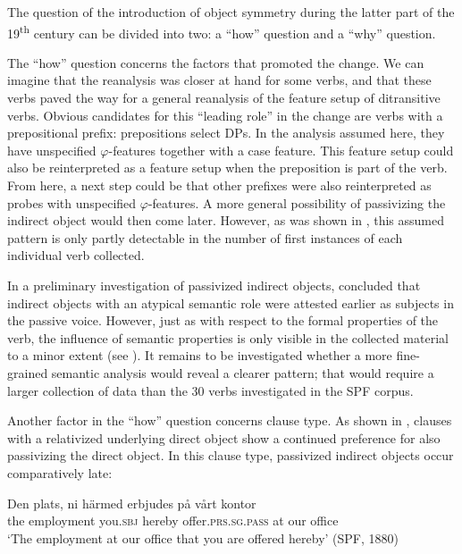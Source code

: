 \documentclass[output=paper]{langscibook}
\begin{document}
The question of the introduction of object symmetry during the latter part of the 19\textsuperscript{th} century can be divided into two: a “how” question and a “why” question.


The “how” question concerns the factors that promoted the change. We can imagine that the reanalysis was closer at hand for some verbs, and that these verbs paved the way for a general reanalysis of the feature setup of ditransitive verbs. Obvious candidates for this “leading role” in the change are verbs with a prepositional prefix: prepositions select DPs. In the analysis assumed here, they have unspecified $\varphi ${}-features together with a case feature. This feature setup could also be reinterpreted as a feature setup when the preposition is part of the verb. From here, a next step could be that other prefixes were also reinterpreted as probes with unspecified $\varphi ${}-features. A more general possibility of passivizing the indirect object would then come later. However, as was shown in , this assumed pattern is only partly detectable in the number of first instances of each individual verb collected.



In a preliminary investigation of passivized indirect objects, \citet{Falk1995,Falk1997} concluded that indirect objects with an atypical semantic role were attested earlier as subjects in the passive voice. However, just as with respect to the formal properties of the verb, the influence of semantic properties is only visible in the collected material to a minor extent (see ). It remains to be investigated whether a more fine-grained semantic analysis would reveal a clearer pattern; that would require a larger collection of data than the 30 verbs investigated in the SPF corpus.



Another factor in the “how” question concerns clause type. As shown in , clauses with a relativized underlying direct object show a continued preference for also passivizing the direct object. In this clause type, passivized indirect objects occur comparatively late:


\ea%
    \label{ex:falk:24}
\gll Den    plats,        ni        härmed  erbjudes          på  vårt  kontor\\
    the    employment  you.\textsc{sbj}  hereby    offer\textsc{.prs.sg.pass}    at  our  office\\
\glt ‘The employment at our office that you are offered hereby’ (SPF, 1880)
\z
\end{document}
